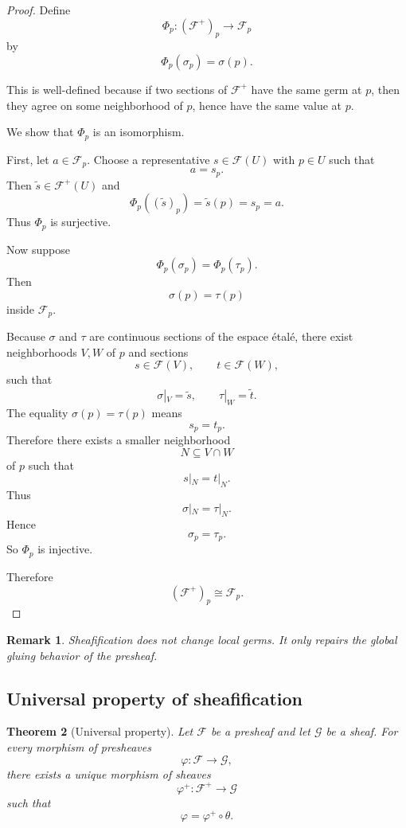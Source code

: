 \documentclass[12pt,a4paper]{article}
\newtheorem{theorem}{Theorem}[section]
\newtheorem{remark}[theorem]{Remark}
\begin{document}
\begin{proof}
	Define
	\[
	\Phi_p : (\mathcal F^+)_p \longrightarrow \mathcal F_p
	\]
	by
	\[
	\Phi_p(\sigma_p)=\sigma(p).
	\]
	
	This is well-defined because if two sections of $\mathcal F^+$ have the same
	germ at $p$, then they agree on some neighborhood of $p$, hence have the same
	value at $p$.
	
	We show that $\Phi_p$ is an isomorphism.
	
	First, let $a \in \mathcal F_p$.
	Choose a representative $s \in \mathcal F(U)$ with $p \in U$ such that
	\[
	a=s_p.
	\]
	Then $\widetilde{s} \in \mathcal F^+(U)$ and
	\[
	\Phi_p((\widetilde{s})_p)
	=
	\widetilde{s}(p)
	=
	s_p
	=
	a.
	\]
	Thus $\Phi_p$ is surjective.
	
	Now suppose
	\[
	\Phi_p(\sigma_p)=\Phi_p(\tau_p).
	\]
	Then
	\[
	\sigma(p)=\tau(p)
	\]
	inside $\mathcal F_p$.
	
	Because $\sigma$ and $\tau$ are continuous sections of the espace \'{e}tal\'{e},
	there exist neighborhoods $V,W$ of $p$ and sections
	\[
	s \in \mathcal F(V),
	\qquad
	t \in \mathcal F(W),
	\]
	such that
	\[
	\sigma|_V=\widetilde{s},
	\qquad
	\tau|_W=\widetilde{t}.
	\]
	The equality $\sigma(p)=\tau(p)$ means
	\[
	s_p=t_p.
	\]
	Therefore there exists a smaller neighborhood
	\[
	N \subseteq V \cap W
	\]
	of $p$ such that
	\[
	s|_N=t|_N.
	\]
	Thus
	\[
	\sigma|_N=\tau|_N.
	\]
	Hence
	\[
	\sigma_p=\tau_p.
	\]
	So $\Phi_p$ is injective.
	
	Therefore
	\[
	(\mathcal F^+)_p \cong \mathcal F_p.
	\]
\end{proof}

\begin{remark}
	Sheafification does not change local germs.
	It only repairs the global gluing behavior of the presheaf.
\end{remark}

\subsection{Universal property of sheafification}

\begin{theorem}[Universal property]
	Let $\mathcal F$ be a presheaf and let $\mathcal G$ be a sheaf.
	For every morphism of presheaves
	\[
	\varphi : \mathcal F \longrightarrow \mathcal G,
	\]
	there exists a unique morphism of sheaves
	\[
	\varphi^+ : \mathcal F^+ \longrightarrow \mathcal G
	\]
	such that
	\[
	\varphi=\varphi^+ \circ \theta.
	\]
\end{theorem}
\end{document}
